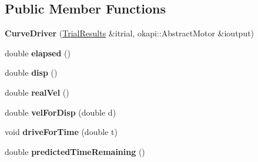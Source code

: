 \subsection*{Public Member Functions}
\begin{DoxyCompactItemize}
\item 
\mbox{\label{classCurveDriver_abd46031f6a7c1f4b5cc8c8ecb5dd25da}} 
{\bfseries Curve\+Driver} (\hyperlink{structTrialResults}{Trial\+Results} \&itrial, okapi\+::\+Abstract\+Motor \&ioutput)
\item 
\mbox{\label{classCurveDriver_a87ee8989aae5b597f1788de01de5a7eb}} 
double {\bfseries elapsed} ()
\item 
\mbox{\label{classCurveDriver_a92ed2d7443067b2233cd24be086cbd7a}} 
double {\bfseries disp} ()
\item 
\mbox{\label{classCurveDriver_acc6953f0a4221bc987b7f31c7f9e8a89}} 
double {\bfseries real\+Vel} ()
\item 
\mbox{\label{classCurveDriver_acc2eadbd0a2788e6db0c21b39e136bbe}} 
double {\bfseries vel\+For\+Disp} (double d)
\item 
\mbox{\label{classCurveDriver_a2932cc25ea69dd3dfb88a2790be84814}} 
void {\bfseries drive\+For\+Time} (double t)
\item 
\mbox{\label{classCurveDriver_aa4f8ee1ee14a30829c473aa5299d9a8d}} 
double {\bfseries predicted\+Time\+Remaining} ()
\end{DoxyCompactItemize}
